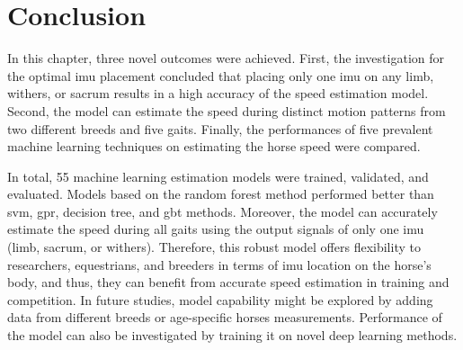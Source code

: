 \section{Conclusion}
\label{sec:conclusion}

In this chapter, three novel outcomes were achieved. First, the investigation for the optimal \gls{imu} placement concluded that placing only one \gls{imu} on any limb, withers, or sacrum results in a high accuracy of the speed estimation model. Second, the model can estimate the speed during distinct motion patterns from two different breeds and five gaits. Finally, the performances of five prevalent machine learning techniques on estimating the horse speed were compared. 

In total, 55 machine learning estimation models were trained, validated, and evaluated. Models based on the random forest method performed better than \gls{svm}, \gls{gpr}, decision tree, and \gls{gbt} methods. Moreover, the model can accurately estimate the speed during all gaits using the output signals of only one \gls{imu} (limb, sacrum, or withers). Therefore, this robust model offers flexibility to researchers, equestrians, and breeders in terms of \gls{imu} location on the horse's body, and thus, they can benefit from accurate speed estimation in training and competition. In future studies, model capability might be explored by adding data from different breeds or age-specific horses measurements. Performance of the model can also be investigated by training it on novel deep learning methods.